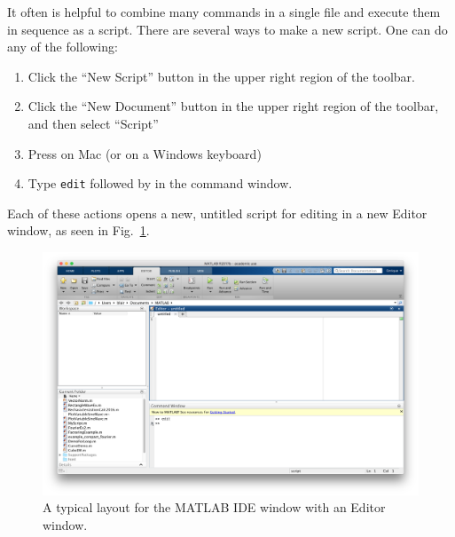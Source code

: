 It often is helpful to combine many commands in a single file and execute them in sequence as a script. There are several ways to make a new script. One can do any of the following:
\begin{enumerate}
\item Click the ``New Script'' button in the upper right region of the toolbar.
\item Click the ``New Document'' button in the upper right region of the toolbar, and then select ``Script''
\item Press  on Mac (or  on a Windows keyboard)
\item Type \texttt{edit} followed by \keys{\return} in the command window. %
\end{enumerate}
Each of these actions opens a new, untitled script for editing in a new Editor window, as seen in Fig.\ \ref{fig:MATLAB_IDE_with_Editor}.

\begin{figure}[htbp] %
   \centering
   \includegraphics[width=1\textwidth]{graphics/MATLAB_Main_Window_with_Editor.png} 
   \caption{A typical layout for the MATLAB IDE window with an Editor window.}
   \label{fig:MATLAB_IDE_with_Editor}
\end{figure}



